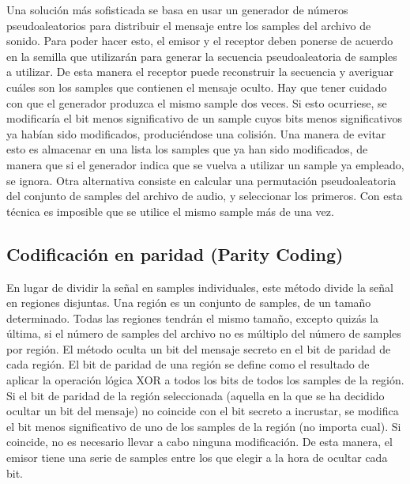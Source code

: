 \documentclass[12pt]{article}
\begin{document}
Una solución más sofisticada se basa en usar un generador de números pseudoaleatorios para distribuir el mensaje entre los samples del archivo de sonido. Para poder hacer esto, el emisor y el receptor deben ponerse de acuerdo en la semilla que utilizarán para generar la secuencia pseudoaleatoria de samples a utilizar. De esta manera el receptor puede reconstruir la secuencia y averiguar cuáles son los samples que contienen el mensaje oculto. Hay que tener cuidado con que el generador produzca el mismo sample dos veces. Si esto ocurriese, se modificaría el bit menos significativo de un sample cuyos bits menos significativos ya habían sido modificados, produciéndose una colisión. Una manera de evitar esto es almacenar en una lista los samples que ya han sido modificados, de manera que si el generador indica que se vuelva a utilizar un sample ya empleado, se ignora. Otra alternativa consiste en calcular una permutación pseudoaleatoria del conjunto de samples del archivo de audio, y seleccionar los primeros. Con esta técnica es imposible que se utilice el mismo sample más de una vez.

\subsection{Codificación en paridad (Parity Coding)}

En lugar de dividir la señal en samples individuales, este método divide la señal en regiones disjuntas. Una región es un conjunto de samples, de un tamaño determinado. Todas las regiones tendrán el mismo tamaño, excepto quizás la última, si el número de samples del archivo no es múltiplo del número de samples por región. El método oculta un bit del mensaje secreto en el bit de paridad de cada región. El bit de paridad de una región se define como el resultado de aplicar la operación lógica XOR a todos los bits de todos los samples de la región. Si el bit de paridad de la región seleccionada (aquella en la que se ha decidido ocultar un bit del mensaje) no coincide con el bit secreto a incrustar, se modifica el bit menos significativo de uno de los samples de la región (no importa cual). Si coincide, no es necesario llevar a cabo ninguna modificación. De esta manera, el emisor tiene una serie de samples entre los que elegir a la hora de ocultar cada bit.
\end{document}
